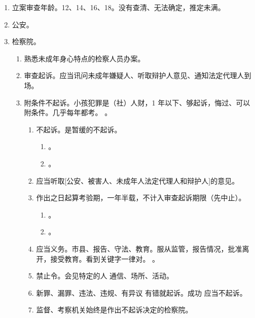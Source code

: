 \begin{enumerate}
\begin{enumerate}
        \end{enumerate}
  \item 立案审查年龄。12、14、16、18。没有查清、无法确定，推定未满。
  \item 公安。
  \item 检察院。
        \begin{enumerate}
          \item 熟悉未成年身心特点的检察人员办案。
          \item 审查起诉。应当讯问未成年嫌疑人、听取辩护人意见、通知法定代理人到场。
          \item 附条件不起诉。小孩犯罪是（社）人财，1 年以下、够起诉，悔过、可以附条件。几乎每年都考。
                。
                \begin{enumerate}
                  \item \bdy 不起诉。是暂缓的不起诉。
                        \begin{enumerate}
                          \item {}。
                          \item {}。
                        \end{enumerate}
                  \item 应当听取[公安、被害人、未成年人法定代理人和辩护人]的意见。
                  \item 作出之日起算考验期，一年半载，不计入审查起诉期限（先中止）。
                        \begin{enumerate}
                          \item {}。
                          \item {}。
                        \end{enumerate}
                  \item 应当义务。市县、报告、守法、教育。服从监管，报告情况，批准离开，接受教育。看到关键字一律对。
                        。
                  \item 禁止令。会见特定的人 \hz 通信、场所、活动。
                  \item 新罪、漏罪、违法、违规、有异议 \yjt 有错就起诉。成功 \yjt 应当不起诉。
                  \item 监督、考察机关始终是作出不起诉决定的检察院。
                        \begin{enumerate}

\end{enumerate}
\end{enumerate}
\end{enumerate}
\end{enumerate}
